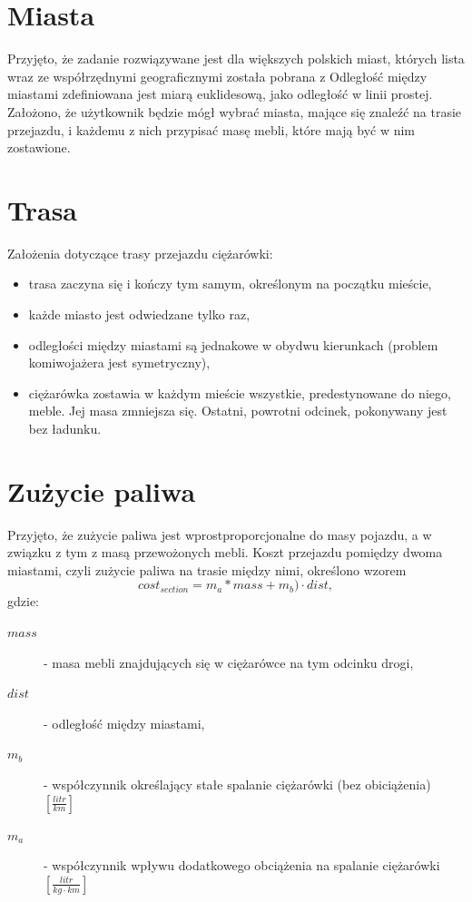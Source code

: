 \documentclass[12pt, oneside, final]{report}
\begin{document}
\section{Miasta}
Przyjęto, że zadanie rozwiązywane jest dla większych polskich miast, których lista wraz ze współrzędnymi geograficznymi została pobrana z %
Odległość między miastami zdefiniowana jest miarą euklidesową, jako odległość w linii prostej. Założono, że użytkownik będzie mógł wybrać miasta, mające się znaleźć na trasie przejazdu, i każdemu z nich przypisać masę mebli, które mają być w nim zostawione.

\section{Trasa}
Założenia dotyczące trasy przejazdu ciężarówki:
\begin{itemize}
\item trasa zaczyna się i kończy tym samym, określonym na początku mieście,
\item każde miasto jest odwiedzane tylko raz,
\item odległości między miastami są jednakowe w obydwu kierunkach (problem komiwojażera jest symetryczny),
\item ciężarówka zostawia w każdym mieście wszystkie, predestynowane do niego, meble. Jej masa zmniejsza się. Ostatni, powrotni odcinek, pokonywany jest bez ładunku.
\end{itemize}

\section{Zużycie paliwa}
Przyjęto, że zużycie paliwa jest wprostproporcjonalne do masy pojazdu, a w związku z tym z masą przewożonych mebli. Koszt przejazdu pomiędzy dwoma miastami, czyli zużycie paliwa na trasie między nimi, określono wzorem
\begin{equation}
cost_{section} = m_a * mass + m_b) \cdot dist,
\end{equation}
gdzie: 
\begin{description}
\item[$mass$] - masa mebli znajdujących się w ciężarówce na tym odcinku drogi,
\item[$dist$] - odległość między miastami,
\item[$m_b$] - współczynnik określający stałe spalanie ciężarówki (bez obiciążenia) $[\frac{litr}{km}]$
\item[$m_a$] - współczynnik wpływu dodatkowego obciążenia na spalanie ciężarówki $[\frac{litr}{kg \cdot km}]$
\end{description}
\end{document}

